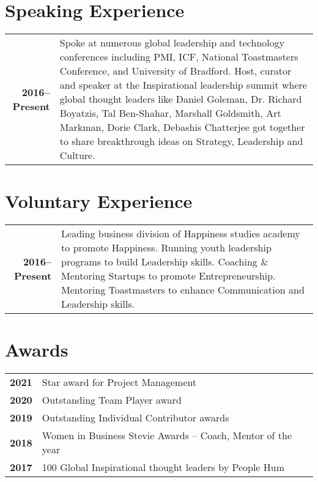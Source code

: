 \documentclass[lighthipster]{simplehipstercv}
\begin{document}
\begin{paracol}{2}
\begin{minipage}[t]{0.3\textwidth}
\section*{Speaking Experience}
\begin{tabular}{>{\footnotesize\bfseries}r >{\footnotesize}p{}}
    2016--Present & Spoke at numerous global leadership and technology conferences including PMI, ICF, National Toastmasters Conference, and University of Bradford. Host, curator and speaker at the Inspirational leadership summit where global thought leaders like Daniel Goleman, Dr. Richard Boyatzis, Tal Ben-Shahar, Marshall Goldsmith, Art Markman, Dorie Clark, Debashis Chatterjee got together to share breakthrough ideas on Strategy, Leadership and Culture.
\end{tabular}
\bigskip

\section*{Voluntary Experience}
\begin{tabular}{>{\footnotesize\bfseries}r >{\footnotesize}p{}}
    2016--Present & Leading business division of Happiness studies academy to promote Happiness. Running youth leadership programs to build Leadership skills. Coaching \& Mentoring Startups to promote Entrepreneurship. Mentoring Toastmasters to enhance Communication and Leadership skills.
\end{tabular}
\bigskip

\end{minipage}\hfill

\begin{minipage}[t]{0.3\textwidth}
\section*{Awards}
\begin{tabular}{>{\footnotesize\bfseries}r >{\footnotesize}p{}}
    2021 & Star award for Project Management \\
    2020 & Outstanding Team Player award \\
    2019 & Outstanding Individual Contributor awards \\
    2018 & Women in Business Stevie Awards – Coach, Mentor of the year \\
    2017 & 100 Global Inspirational thought leaders by People Hum
\end{tabular}
\bigskip


\end{minipage}
\end{paracol}
\end{document}
